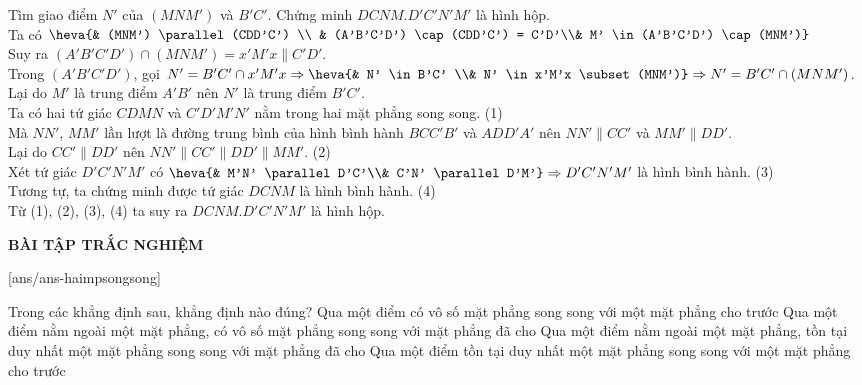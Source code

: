 \begin{bt}
{\begin{listEX}
{}	
\item Tìm giao điểm $N'$ của $(MNM')$ và $B'C'$. Chứng minh $DCNM.D'C'N'M'$ là hình hộp.
\\Ta có $\heva{& (MNM') \parallel (CDD'C') \\ & (A'B'C'D') \cap (CDD'C') = C'D'\\& M' \in (A'B'C'D') \cap (MNM')}$\\
Suy ra $(A'B'C'D') \cap (MNM') = x'M'x \parallel C'D'$.\\
Trong $(A'B'C'D')$, gọi $N' = B'C' \cap x'M'x \Rightarrow \heva{& N' \in B'C' \\& N' \in x'M'x \subset (MNM')}\Rightarrow N' = B'C' \cap (MNM')$.\\	
Lại do $M'$ là trung điểm $A'B'$ nên $N'$ là trung điểm $B'C'$.\\
Ta có hai tứ giác $CDMN$ và $C'D' M'N'$ nằm trong hai mặt phẳng song song. \quad (1)\\
Mà $NN'$, $MM'$ lần lượt là đường trung bình của hình bình hành $BCC'B'$ và $ADD'A'$ nên $NN' \parallel CC'$ và $MM' \parallel DD'$.\\
Lại do $CC' \parallel DD'$ nên $NN' \parallel CC' \parallel DD' \parallel MM'$. \quad (2)\\
Xét tứ giác $D'C'N'M'$ có $\heva{& M'N' \parallel D'C'\\& C'N' \parallel D'M'} \Rightarrow D'C' N'M'$ là hình bình hành. \quad (3)\\
Tương tự, ta chứng minh được tứ giác $DCNM$ là hình bình hành. \quad (4)
\\ Từ (1), (2), (3), (4) ta suy ra $DCNM.D'C'N'M'$ là hình hộp.
\end{listEX}
}
\end{bt}

\begin{tcolorbox}[colback=red!5!white,colframe=red!75!black] \begin{center}
\textbf{ BÀI TẬP TRẮC NGHIỆM} \end{center} \end{tcolorbox}
\setcounter{ex}{0}
[ans/ans-haimpsongsong]

\begin{ex}%
	Trong các khẳng định sau, khẳng định nào đúng?
	\choice
	{ Qua một điểm có vô số mặt phẳng song song với một mặt phẳng cho trước}
	{ Qua một điểm nằm ngoài một mặt phẳng, có vô số mặt phẳng song song với mặt phẳng đã cho}
	{\True Qua một điểm nằm ngoài một mặt phẳng, tồn tại duy nhất một mặt phẳng song song với mặt phẳng đã cho}
	{Qua một điểm tồn tại duy nhất một mặt phẳng song song với một mặt phẳng cho trước}
\end{ex}


